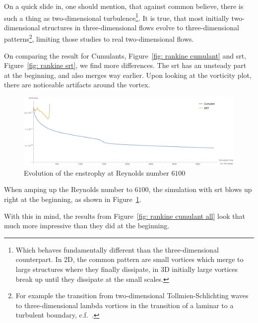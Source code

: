 On a quick slide in, one should mention, that against common believe, there is such a thing as two-dimensional turbulence\footnote{Which behaves fundamentally different than the three-dimensional counterpart. In 2D, the common pattern are small vortices which merge to large structures where they finally dissipate, in 3D initially large vortices break up until they dissipate at the small scales.}.
It is true, that most initially two-dimensional structures in three-dimensional flows evolve to three-dimensional patterns\footnote{For
example the transition from two-dimensional Tollmien-Schlichting waves to  three-dimensional lambda vortices in the transition of a laminar to a turbulent boundary, c.f.~\cite{knörnschild2001untersuchungen}.},
limiting those studies to real two-dimensional flows.

On comparing the result for Cumulants, Figure~\ref{fig: rankine cumulant} and \gls{srt}, Figure~\ref{fig: rankine srt}, we find more differences.
The \gls{srt} has an unsteady part at the beginning, and also merges way earlier.
Upon looking at the vorticity plot, there are noticeable artifacts around the vortex.

\begin{figure}
  \centering
  \includegraphics[width=\textwidth]{../figures/vortexMerge_enstrophy6100.pdf}  %
  \caption{Evolution of the enstrophy at Reynolds number $6100$}
\label{fig: rankine 6100}
\end{figure}
When amping up the Reynolds number to $6100$, the simulation with \gls{srt} blows up right at the beginning, as shown in Figure~\ref{fig: rankine 6100}.

With this in mind, the results from Figure~\ref{fig: rankine cumulant all} look that much more impressive than they did at the beginning.
